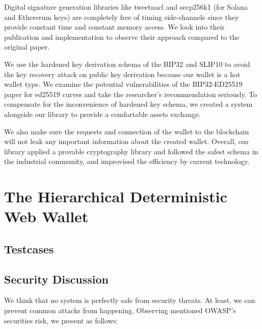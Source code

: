 Digital signature generation libraries like tweetnacl and secp256k1 (for Solana and Ethererum keys) are completely free of timing side-channels since they provide constant time and constant memory access. We look into their publication and implementation to observe their approach compared to the original paper.

We use the hardened key derivation schema of the BIP32 and SLIP10 to avoid the key recovery attack on public key derivation because our wallet is a hot wallet type. We examine the potential vulnerabilities of the BIP32-ED25519 paper for ed25519 curves and take the researcher's recommendation seriously. To compensate for the inconvenience of hardened key schema, we created a system alongside our library to provide a comfortable assets exchange.

We also make sure the requests and connection of the wallet to the blockchain will not leak any important information about the created wallet. Overall, our library applied a provable cryptography library and followed the safest schema in the industrial community, and improvised the efficiency by current technology.

\section{The Hierarchical Deterministic Web Wallet}
\label{testhd}
\subsection{Testcases}
\subsection{Security Discussion}

We think that no system is perfectly safe from security threats. At least, we can prevent common attacks from happening. Observing mentioned OWASP’s securities risk, we present as follows:

